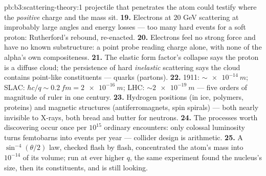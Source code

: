 \begin{solution}{pb:b3:scattering-theory:1}
projectile that penetrates the atom could testify where the
\emph{positive} charge and the mass sit.
\textbf{19.} Electrons at $20$ GeV scattering at improbably
large angles and energy losses --- too many hard events for a
soft proton: Rutherford's rebound, re-enacted.
\textbf{20.} Electrons feel no strong force and have no known
substructure: a point probe reading charge alone, with none of
the alpha's own compositeness.
\textbf{21.} The elastic form factor's collapse says the proton
is a diffuse cloud; the persistence of hard \emph{inelastic}
scattering says the cloud contains point-like constituents ---
quarks (partons).
\textbf{22.} 1911: $\sim\qty{e-14}{m}$; SLAC: $\hbar c/q \sim
\qty{0.2}{fm} = \qty{2e-16}{m}$; LHC: $\sim\qty{2e-19}{m}$ ---
five orders of magnitude of ruler in one century.
\textbf{23.} Hydrogen positions (in ice, polymers, proteins) and
magnetic structures (antiferromagnets, spin spirals) --- both
nearly invisible to X-rays, both bread and butter for neutrons.
\textbf{24.} The processes worth discovering occur once per
$10^{15}$ ordinary encounters: only colossal luminosity turns
femtobarns into events per year --- collider design is
 arithmetic.
\textbf{25.} A $\sin^{-4}(\theta/2)$ law, checked flash by flash,
concentrated the atom's mass into $10^{-14}$ of its volume; run
at ever higher $q$, the same experiment found the nucleus's size,
then its constituents, and is still looking.
\end{solution}
